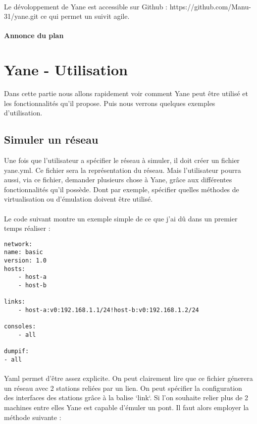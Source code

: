 \documentclass{article}
\begin{document}
		
	\paragraph{}
	Le dévoloppement de Yane est accessible sur Github :
	\newline https://github.com/Manu-31/yane.git ce qui permet un suivit agile.
	\paragraph{Annonce du plan}

	\newpage	



	\section{Yane - Utilisation}
		Dans cette partie nous allons rapidement voir comment Yane peut être utilisé et les fonctionnalités qu'il propose. Puis nous verrons quelques exemples d'utilisation.		

		\subsection{Simuler un réseau}
		Une fois que l'utilisateur a spécifier le réseau à simuler, il doit créer un fichier yane.yml. Ce fichier sera la représentation du réseau. Mais l'utilisateur pourra aussi, via ce fichier, demander plusieurs chose à Yane, grâce aux différentes fonctionnalités qu'il possède. Dont par exemple, spécifier quelles méthodes de virtualisation ou d'émulation doivent être utilisé.
		
		\paragraph{}
		Le code suivant montre un exemple simple de ce que j'ai dû dans un premier temps réaliser :
		
		\begin{lstlisting}[basicstyle=\small, caption=Réseau à 2 stations]
network:
name: basic
version: 1.0
hosts:
	- host-a
	- host-b

links:
	- host-a:v0:192.168.1.1/24!host-b:v0:192.168.1.2/24

consoles:
	- all

dumpif:
- all
		\end{lstlisting}

		\paragraph{}
		Yaml permet d'être assez explicite. On peut clairement lire que ce fichier génerera un réseau avec 2 stations reliées par un lien. On peut spécifier la configuration des interfaces des stations grâce à la balise `link`. Si l'on souhaite relier plus de 2 machines entre elles Yane est capable d'émuler un pont. Il faut alors employer la méthode suivante :
\end{document}
